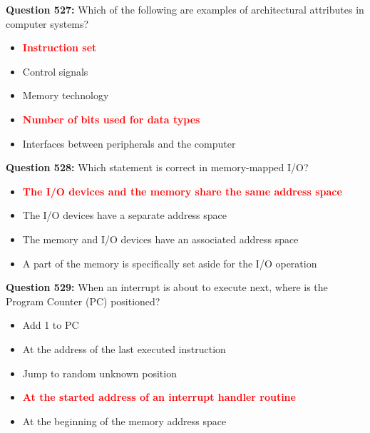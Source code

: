 \documentclass[12pt,a4paper]{article}
\begin{document}
\textbf{Question 527:} Which of the following are examples of architectural attributes in computer systems?

\begin{itemize}
    \item[\textbf{A.}] \textcolor{red}{\textbf{Instruction set}}
    \item[\textbf{B.}] Control signals
    \item[\textbf{C.}] Memory technology
    \item[\textbf{D.}] \textcolor{red}{\textbf{Number of bits used for data types}}
    \item[\textbf{E.}] Interfaces between peripherals and the computer
\end{itemize}

\vspace{0.5cm}

\textbf{Question 528:} Which statement is correct in memory-mapped I/O?

\begin{itemize}
    \item[\textbf{A.}] \textcolor{red}{\textbf{The I/O devices and the memory share the same address space}}
    \item[\textbf{B.}] The I/O devices have a separate address space
    \item[\textbf{C.}] The memory and I/O devices have an associated address space
    \item[\textbf{D.}] A part of the memory is specifically set aside for the I/O operation
\end{itemize}

\vspace{0.5cm}

\textbf{Question 529:} When an interrupt is about to execute next, where is the Program Counter (PC) positioned?

\begin{itemize}
    \item[\textbf{A.}] Add 1 to PC
    \item[\textbf{B.}] At the address of the last executed instruction
    \item[\textbf{C.}] Jump to random unknown position
    \item[\textbf{D.}] \textcolor{red}{\textbf{At the started address of an interrupt handler routine}}
    \item[\textbf{E.}] At the beginning of the memory address space
\end{itemize}
\end{document}
